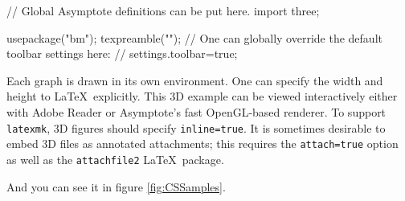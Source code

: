 \documentclass[12pt]{article}
\begin{document}


\begin{asydef}
// Global Asymptote definitions can be put here.
import three;

usepackage("bm");
texpreamble("\def\V#1{\bm{#1}}");
// One can globally override the default toolbar settings here:
// settings.toolbar=true;
\end{asydef}


Each graph is drawn in its own environment. One can specify the width
and height to \LaTeX\ explicitly. This 3D example can be viewed
interactively either with Adobe Reader or Asymptote's fast OpenGL-based
renderer. To support {\tt latexmk}, 3D figures should specify
\verb+inline=true+. It is sometimes desirable to embed 3D files as annotated
attachments; this requires the \verb+attach=true+ option as well as the
\verb+attachfile2+ \LaTeX\ package.



And you can see it in figure \ref{fig:CSSamples}.
\end{document}
